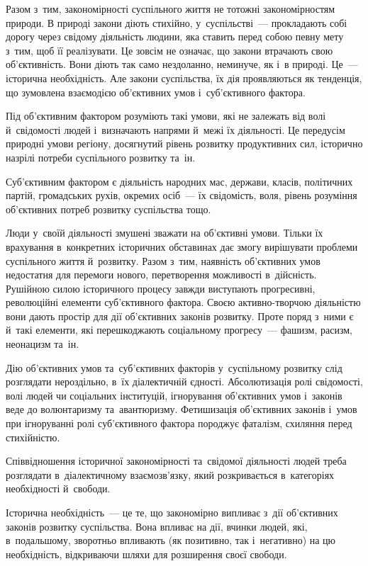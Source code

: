 \documentclass[a5paper,oneside,DIV=12,12pt,headings=small]{scrartcl}
\begin{document}
		Разом з~тим, закономірності суспільного життя не тотожні закономірностям природи. В природі закони діють стихійно, у~суспільстві~— прокладають собі дорогу через свідому діяльність людини, яка ставить перед собою певну мету з~тим, щоб її реалізувати. Це зовсім не означає, що закони втрачають свою об'\-єктивність. Вони діють так само нездоланно, неминуче, як і~в природі. Це~— історична необхідність. Але закони суспільства, їх дія проявляються як тенденція, що зумовлена взаємодією об'\-єк\-тив\-них умов і~суб'\-єктивного фактора.
		
		Під об'\-єктивним фактором розуміють такі умови, які не залежать від волі й~свідомості людей і~визначають напрями й~межі їх діяльності. Це передусім природні умови регіону, досягнутий рівень розвитку продуктивних сил, історично назрілі потреби суспільного розвитку та~ін.
		
		Суб'єктивним фактором є діяльність народних мас, держави, класів, політичних партій, громадських рухів, окремих осіб~— їх свідомість, воля, рівень розуміння об'\-єк\-тив\-них потреб розвитку суспільства тощо.
		
		Люди у~своїй діяльності змушені зважати на об'\-єктивні умови. Тільки їх врахування в~конкретних історичних обставинах дає змогу вирішувати проблеми суспільного життя й~розвитку. Разом з~тим, наявність об'\-єк\-тив\-них умов недостатня для перемоги нового, перетворення можливості в~дійсність. Рушійною силою історичного процесу завжди виступають прогресивні, революційні елементи суб'\-єктивного фактора. Своєю активно-творчою діяльністю вони дають простір для дії об'\-єк\-тив\-них законів розвитку. Проте поряд з~ними є й~такі елементи, які перешкоджають соціальному прогресу~— фашизм, расизм, неонацизм та~ін.
		
		Дію об'\-єк\-тив\-них умов та~суб'\-єк\-тив\-них факторів у~суспільному розвитку слід розглядати нероздільно, в~їх діалектичній єдності. Абсолютизація ролі свідомості, волі людей чи соціальних інституцій, ігнорування об'\-єк\-тив\-них умов і~законів веде до волюнтаризму та~авантюризму. Фетишизація об'\-єк\-тив\-них законів і~умов при ігноруванні ролі суб'\-єктивного фактора породжує фаталізм, схиляння перед стихійністю.
		
		Співвідношення історичної закономірності та~свідомої діяльності людей треба розглядати в~діалектичному взаємозв'язку, який розкривається в~категоріях необхідності й~свободи.
		
		Історична необхідність~— це те, що закономірно випливає з~дії об'\-єк\-тив\-них законів розвитку суспільства. Вона впливає на дії, вчинки людей, які, в~подальшому, зворотньо впливають (як позитивно, так і~негативно) на цю необхідність, відкриваючи шляхи для розширення своєї свободи.
		
\end{document}
